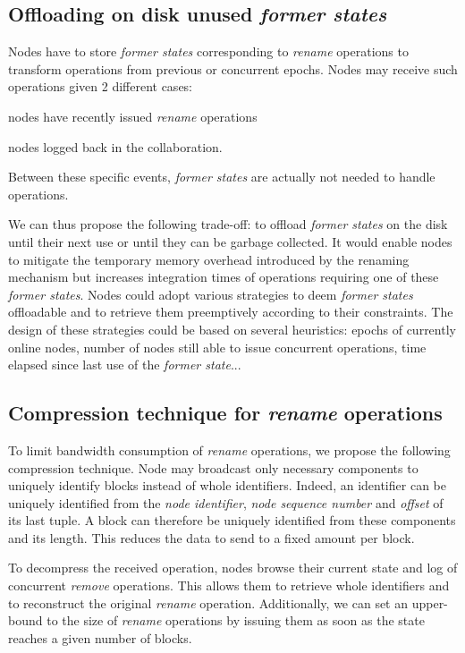 \documentclass[10pt,journal,compsoc]{IEEEtran}
\begin{document}
\subsection{Offloading on disk unused \emph{former states}}
\label{sec:offloading-former-states}

Nodes have to store \emph{former states} corresponding to \emph{rename} operations to transform operations from previous or concurrent epochs.
Nodes may receive such operations given 2 different cases:
\begin{enumerate*}[label=(\roman*)]
    \item nodes have recently issued \emph{rename} operations
    \item nodes logged back in the collaboration.
\end{enumerate*}
Between these specific events, \emph{former states} are actually not needed to handle operations.

We can thus propose the following trade-off: to offload \emph{former states} on the disk until their next use or until they can be garbage collected.
It would enable nodes to mitigate the temporary memory overhead introduced by the renaming mechanism but increases integration times of operations requiring one of these \emph{former states}.
Nodes could adopt various strategies to deem \emph{former states} offloadable and to retrieve them preemptively according to their constraints.
The design of these strategies could be based on several heuristics: epochs of currently online nodes, number of nodes still able to issue concurrent operations, time elapsed since last use of the \emph{former state}...

\subsection{Compression technique for \emph{rename} operations}

To limit bandwidth consumption of \emph{rename} operations, we propose the following compression technique.
Node may broadcast only necessary components to uniquely identify blocks instead of whole identifiers.
Indeed, an identifier can be uniquely identified from the \emph{node identifier}, \emph{node sequence number} and \emph{offset} of its last tuple.
A block can therefore be uniquely identified from these components and its length.
This reduces the data to send to a fixed amount per block.

To decompress the received operation, nodes browse their current state and log of concurrent \emph{remove} operations.
This allows them to retrieve whole identifiers and to reconstruct the original \emph{rename} operation.
Additionally, we can set an upper-bound to the size of \emph{rename} operations by issuing them as soon as the state reaches a given number of blocks.
\end{document}
